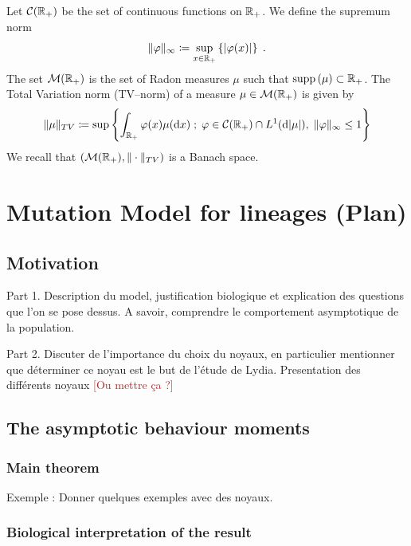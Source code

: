 \documentclass[11pt]{amsart}
\newcommand{\dd}{\mathrm{d}}
\newcommand{\ndr}[1]{\textcolor{brown}{[#1]}}
\newcommand{\supp}{\mathrm{supp}\,}
\begin{document}
Let $\mathcal{C}(\mathbb{R}_+)$ be the set of continuous functions on $\mathbb{R}_+$. We define the supremum norm
\begin{equation*}
    \|\varphi\|_{\infty} \coloneqq\sup_{x \in \mathbb{R}_+} \left\{ |\varphi(x)| \right\}
    \; .
\end{equation*}
The set $\mathcal{M}(\mathbb{R}_+)$ is the set of Radon measures $\mu$ such that $\supp(\mu) \subset \RR_+$. The Total Variation norm (TV--norm) of a measure $\mu \in \mathcal{M}(\mathbb{R}_+)$ is given by 
    \begin{equation*}
        \|\mu\|_{TV} \coloneqq\sup \left\{ \int_{\RR_+} \varphi(x) \mu(\dd x)\; ; \; \varphi \in \Ccal(\RR_+)\cap L^1(\dd|\mu|),\; \|\varphi\|_{\infty} \leq 1\right\}
    \end{equation*}
We recall that $\left(\mathcal{M}(\mathbb{R}_+), \|\cdot\|_{TV}\right)$ is a Banach space. 

\section*{Mutation Model for lineages (Plan)}\mbox{}
    \subsection*{Motivation}\mbox{}
    Part 1. Description du model, justification biologique et explication des questions que l'on se pose dessus. A savoir, comprendre le comportement asymptotique de la population. 

    Part 2. Discuter de l'importance du choix du noyaux, en particulier mentionner que déterminer ce noyau est le but de l'étude de Lydia. Presentation des différents noyaux \ndr{Ou mettre ça ?}

    \subsection*{The asymptotic behaviour moments}
        \subsubsection*{Main theorem}
        \begin{remark}
        \end{remark}
        Exemple : Donner quelques exemples avec des noyaux. 
        \subsubsection*{Biological interpretation of the result}
\end{document}
